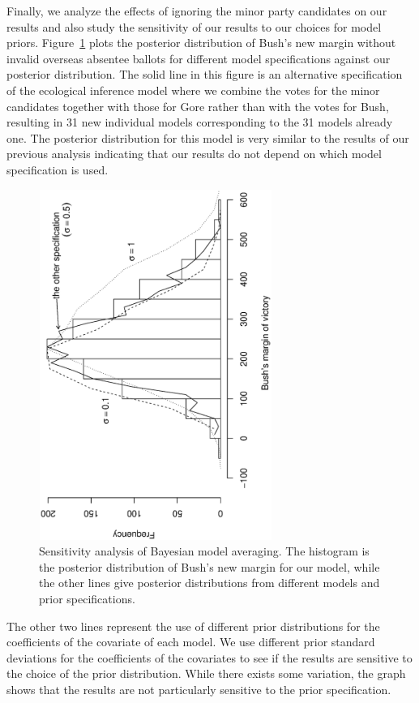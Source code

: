 \documentclass[11pt,titlepage]{article}
\begin{document}
Finally, we analyze the effects of ignoring the minor party candidates
on our results and also study the sensitivity of our results to our
choices for model priors.  Figure~\ref{fg:sensitivity} plots the
posterior distribution of Bush's new margin without invalid overseas
absentee ballots for different model specifications against our
posterior distribution.  The solid line in this figure is an
alternative specification of the ecological inference model where we
combine the votes for the minor candidates together with those for
Gore rather than with the votes for Bush, resulting in 31 new
individual models corresponding to the 31 models already one.  The
posterior distribution for this model is very similar to the results
of our previous analysis indicating that our results do not depend on
which model specification is used.
\begin{figure}[t]
\begin{center}
\includegraphics[width=3in,height=4.5in,angle=-90]{sensitivity}
\caption{Sensitivity analysis of Bayesian model
  averaging. The histogram is the posterior distribution of Bush's new
  margin for our model, while the other lines give posterior
  distributions from different models and prior specifications.}
\label{fg:sensitivity}
\end{center} 
\end{figure}

The other two lines represent the use of different prior distributions
for the coefficients of the covariate of each model.  We use different
prior standard deviations for the coefficients of the covariates to
see if the results are sensitive to the choice of the prior
distribution.  While there exists some variation, the graph shows that
the results are not particularly sensitive to the prior specification.
\end{document}

